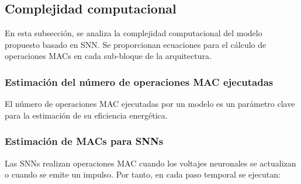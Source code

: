     
    
    

    
\subsection{Complejidad computacional}
\label{subsec:complejidad-computacional}

En esta subsección, se analiza la complejidad computacional del modelo propuesto basado en SNN. Se proporcionan ecuaciones para el cálculo de operaciones MACs en cada sub-bloque de la arquitectura.

\subsubsection{Estimación del número de operaciones MAC ejecutadas}

El número de operaciones MAC ejecutadas por un modelo es un parámetro clave para la estimación de su eficiencia energética.

\subsubsection{Estimación de MACs para SNNs}

Las SNNs realizan operaciones MAC cuando los voltajes neuronales se actualizan o cuando se emite un impulso. Por tanto, en cada paso temporal se ejecutan:

